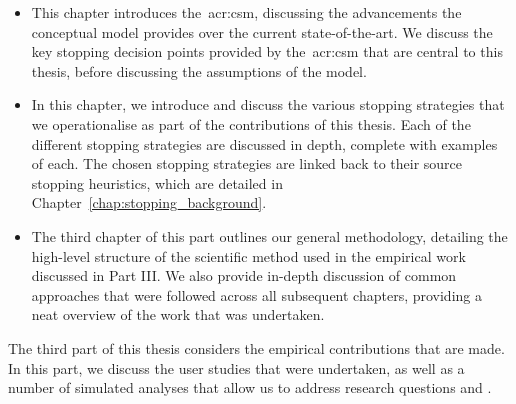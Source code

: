 \begin{itemize}
    \item[]{ This chapter introduces the~\gls{acr:csm}, discussing the advancements the conceptual model provides over the current state-of-the-art. We discuss the key stopping decision points provided by the~\gls{acr:csm} that are central to this thesis, before discussing the assumptions of the model.}
    
    \item[]{ In this chapter, we introduce and discuss the various stopping strategies that we operationalise as part of the contributions of this thesis. Each of the different stopping strategies are discussed in depth, complete with examples of each. The chosen stopping strategies are linked back to their source stopping heuristics, which are detailed in Chapter~\ref{chap:stopping_background}.}
    
    \item[]{ The third chapter of this part outlines our general methodology, detailing the high-level structure of the scientific method used in the empirical work discussed in Part III. We also provide in-depth discussion of common approaches that were followed across all subsequent chapters, providing a neat overview of the work that was undertaken.}
\end{itemize}

\noindent
{}
The third part of this thesis considers the empirical contributions that are made. In this part, we discuss the user studies that were undertaken, as well as a number of simulated analyses that allow us to address research questions  and .

